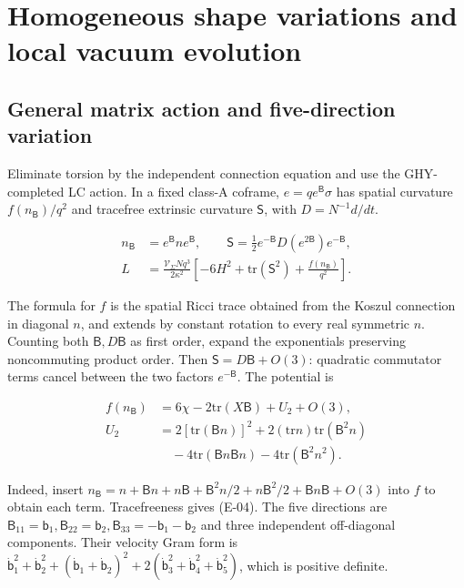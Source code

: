 \section{Homogeneous shape variations and local vacuum evolution}

\subsection{General matrix action and five-direction variation}

Eliminate torsion by the independent connection equation and use the GHY-completed LC action. In a fixed class-A coframe, $e=qe^{\mathsf B}\sigma$ has spatial curvature $f(n_{\mathsf B})/q^2$ and tracefree extrinsic curvature $\mathsf S$, with $D=N^{-1}d/dt$.

\begin{equation}\tag{S-04}\label{eq:S-04}
\begin{aligned}
n_{\mathsf B}&=e^{\mathsf B}ne^{\mathsf B},\qquad
\mathsf S=\tfrac12e^{-\mathsf B}D(e^{2\mathsf B})e^{-\mathsf B},\\
L&=\frac{\mathcal V_{\Sigma}Nq^3}{2\kappa^2}
 \left[-6H^2+\mathrm{tr}(\mathsf S^2)+\frac{f(n_{\mathsf B})}{q^2}\right].
\end{aligned}
\end{equation}

The formula for $f$ is the spatial Ricci trace obtained from the Koszul connection in diagonal $n$, and extends by constant rotation to every real symmetric $n$. Counting both $\mathsf B,D\mathsf B$ as first order, expand the exponentials preserving noncommuting product order. Then $\mathsf S=D\mathsf B+O(3)$: quadratic commutator terms cancel between the two factors $e^{-\mathsf B}$. The potential is

\begin{equation}\tag{S-05}\label{eq:S-05}
\begin{aligned}
f(n_{\mathsf B})&=6\chi-2\mathrm{tr}(X\mathsf B)+U_2+O(3),\\
U_2&=2[\mathrm{tr}(\mathsf Bn)]^2
 +2(\mathrm{tr}n)\mathrm{tr}(\mathsf B^2n)\\
&\hspace{1em}-4\mathrm{tr}(\mathsf Bn\mathsf Bn)
 -4\mathrm{tr}(\mathsf B^2n^2).
\end{aligned}
\end{equation}

Indeed, insert $n_{\mathsf B}=n+\mathsf Bn+n\mathsf B+\mathsf B^2n/2+n\mathsf B^2/2+\mathsf Bn\mathsf B+O(3)$ into $f$ to obtain each term. Tracefreeness gives (E-04). The five directions are $\mathsf B_{11}=\mathsf b_1,\mathsf B_{22}=\mathsf b_2,\mathsf B_{33}=-\mathsf b_1-\mathsf b_2$ and three independent off-diagonal components. Their velocity Gram form is $\dot{\mathsf b}_1^2+\dot{\mathsf b}_2^2+(\dot{\mathsf b}_1+\dot{\mathsf b}_2)^2+2(\dot{\mathsf b}_3^2+\dot{\mathsf b}_4^2+\dot{\mathsf b}_5^2)$, which is positive definite.


